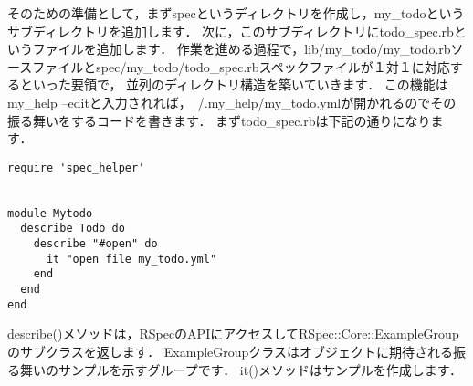そのための準備として，まずspecというディレクトリを作成し，my\_todoというサブディレクトリを追加します．
次に，このサブディレクトリにtodo\_spec.rbというファイルを追加します．
作業を進める過程で，lib/my\_todo/my\_todo.rbソースファイルとspec/my\_todo/todo\_spec.rbスペックファイルが１対１に対応するといった要領で，
並列のディレクトリ構造を築いていきます．
この機能はmy\_help --editと入力されれば，~/.my\_help/my\_todo.ymlが開かれるのでその振る舞いをするコードを書きます．
まずtodo\_spec.rbは下記の通りになります．
\begin{lstlisting}[style=customRuby]
require 'spec_helper'


module Mytodo
  describe Todo do
    describe "#open" do
      it "open file my_todo.yml" 
    end
  end
end

\end{lstlisting}
describe()メソッドは，RSpecのAPIにアクセスしてRSpec::Core::ExampleGroupのサブクラスを返します．
ExampleGroupクラスはオブジェクトに期待される振る舞いのサンプルを示すグループです．
it()メソッドはサンプルを作成します．

